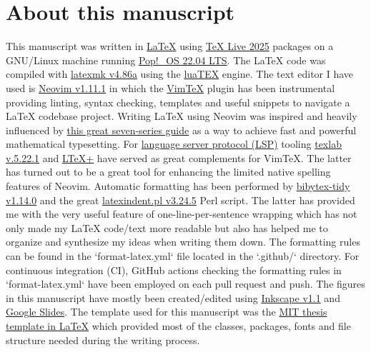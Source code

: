 
\chapter*{About this manuscript} \label{sec:about}

This manuscript was written in \href{https://en.wikipedia.org/wiki/LaTeX}{LaTeX} using \href{https://www.tug.org/texlive/}{TeX Live 2025} packages on a GNU/Linux machine running \href{https://system76.com/pop/download/}{Pop!\_OS 22.04 LTS}.
The LaTeX code was compiled with \href{https://mgeier.github.io/latexmk.html}{latexmk v4.86a} using the \href{https://www.luatex.org/}{luaTEX} engine.
The text editor I have used is \href{https://neovim.io/}{Neovim v1.11.1} in which the \href{https://github.com/lervag/vimtex}{VimTeX} plugin has been instrumental providing linting, syntax checking, templates and useful snippets to navigate a LaTeX codebase project.
Writing LaTeX using Neovim was inspired and heavily influenced by \href{https://ejmastnak.com/tutorials/vim-latex/intro/}{this great seven-series guide} as a way to achieve fast and powerful mathematical typesetting.
For \href{https://microsoft.github.io/language-server-protocol/}{language server protocol (LSP)} tooling \href{https://github.com/latex-lsp/texlab}{texlab v.5.22.1} and \href{https://github.com/ltex-plus/ltex-ls-plus}{LTeX+} have served as great complements for VimTeX.
The latter has turned out to be a great tool for enhancing the limited native spelling features of Neovim.
Automatic formatting has been performed by \href{https://github.com/FlamingTempura/bibtex-tidy}{bibytex-tidy v1.14.0} and the great \href{https://github.com/cmhughes/latexindent.pl}{latexindent.pl v3.24.5} Perl script.
The latter has provided me with the very useful feature of one-line-per-sentence wrapping which has not only made my LaTeX code/text more readable but also has helped me to organize and synthesize my ideas when writing them down.
The formatting rules can be found in the `format-latex.yml` file located in the `.github/` directory.
For continuous integration (CI), GitHub actions checking the formatting rules in `format-latex.yml` have been employed on each pull request and push.
The figures in this manuscript have mostly been created/edited using \href{https://inkscape.org/}{Inkscape v1.1} and \href{https://workspace.google.com/products/slides/}{Google Slides}.
The template used for this manuscript was the \href{https://web.mit.edu/thesis/tex/}{MIT thesis template in LaTeX} which provided most of the classes, packages, fonts and file structure needed during the writing process.

